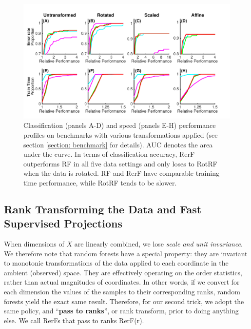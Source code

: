 \documentclass[10pt]{article}
\begin{document}
\begin{figure}[ht]
\vskip 0.2in
\begin{center}
\centerline{\includegraphics[width=\columnwidth]{../Figures/pdf/Fig4_benchmark}}
\caption{Classification (panels A-D) and speed (panels E-H) performance profiles on benchmarks with various transformations applied (see section \ref{section: benchmark} for details). AUC denotes the area under the curve. In terms of classification accuracy, RerF outperforms RF in all five data settings and only loses to RotRF when the data is rotated. RF and RerF have comparable training time performance, while RotRF tends to be slower.}
\label{benchmark}
\end{center}
\vskip -0.2in
\end{figure}

\subsection{Rank Transforming the Data and Fast Supervised Projections}
\label{section: additions}

When dimensions of $X$ are linearly combined, we lose {\em{scale and unit invariance}}. We therefore note that random forests have a special property: they are invariant to monotonic transformations of the data applied to each coordinate in the ambient (observed) space. They are effectively operating on the order statistics, rather than actual magnitudes of coordinates. In other words, if we convert for each dimension the values of the samples to their corresponding ranks, random forests yield the exact same result. Therefore, for our second trick, we adopt the same policy, and ``{\bf{pass to ranks}}'', or rank transform,  prior to doing anything else. We call RerFs that pass to ranks RerF(r).
\end{document}
